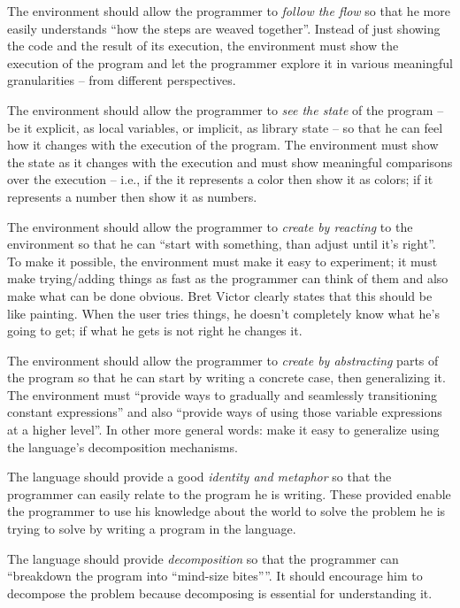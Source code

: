 \documentclass{./llncs2e/llncs}
\begin{document}
The environment should allow the programmer to \emph{follow the flow} so that he more easily understands ``how the steps are weaved together''. Instead of just showing the code and the result of its execution, the environment must show the execution of the program and let the programmer explore it in various meaningful granularities -- from different perspectives.

The environment should allow the programmer to \emph{see the state} of the program -- be it explicit, as local variables, or implicit, as library state -- so that he can feel how it changes with the execution of the program. The environment must show the state as it changes with the execution and must show meaningful comparisons over the execution -- i.e., if the it represents a color then show it as colors; if it represents a number then show it as numbers.

The environment should allow the programmer to \emph{create by reacting} to the environment so that he can ``start with something, than adjust until it's right''. To make it possible, the environment must make it easy to experiment; it must make trying/adding things as fast as the programmer can think of them and also make what can be done obvious. Bret Victor clearly states that this should be like painting. When the user tries things, he doesn't completely know what he's going to get; if what he gets is not right he changes it.

The environment should allow the programmer to \emph{create by abstracting} parts of the program so that he can start by writing a concrete case, then generalizing it. The environment must ``provide ways to gradually and seamlessly transitioning constant expressions'' and also ``provide ways of using those variable expressions at a higher level''. In other more general words: make it easy to generalize using the language's decomposition mechanisms. 

The language should provide a good \emph{identity and metaphor} so that the programmer can easily relate to the program he is writing. These provided enable the programmer to use his knowledge about the world to solve the problem he is trying to solve by writing a program in the language. 

The language should provide \emph{decomposition} so that the programmer can ``breakdown the program into ``mind-size bites''''. It should encourage him to decompose the problem because decomposing is essential for understanding it.
\end{document}
